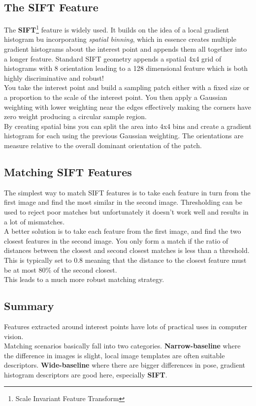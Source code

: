\documentclass{article}
\begin{document}
	\subsection{The SIFT Feature}
	The \textbf{SIFT}\footnote{Scale Invariant Feature Transform} feature is widely used. It builds on the idea of a local gradient histogram bu incorporating \textit{spatial binning}, which in essence creates multiple gradient histograms about the interest point and appends them all together into a longer feature. Standard SIFT geometry appends a spatial 4x4 grid of histograms with 8 orientation leading to a 128 dimensional feature which is both highly discriminative and robust!\\
	You take the interest point and build a sampling patch either with a fixed size or a proportion to the scale of the interest point. You then apply a Gaussian weighting with lower weighting near the edges effectively making the corners have zero weight producing a circular sample region.\\
	By creating spatial bins you can split the area into 4x4 bins and create a gradient histogram for each using the previous Gaussian weighting. The orientations are measure relative to the overall dominant orientation of the patch.
	\subsection{Matching SIFT Features}
	The simplest way to match SIFT features is to take each feature in turn from the first image and find the most similar in the second image. Thresholding can be used to reject poor matches but unfortunately it doesn't work well and results in a lot of mismatches. \\
	A better solution is to take each feature from the first image, and find the two closest features in the second image. You only form a match if the ratio of distances between the closest and second closest matches is less than a threshold. This is typically set to 0.8 meaning that the distance to the closest feature must be at most 80\% of the second closest.\\
	This leads to a much more robust matching strategy.
	\subsection{Summary}
	Features extracted around interest points have lots of practical uses in computer vision.\\
	Matching scenarios basically fall into two categories. \textbf{Narrow-baseline} where the difference in images is slight, local image templates are often suitable descriptors. \textbf{Wide-baseline} where there are bigger differences in pose, gradient histogram descriptors are good here, especially \textbf{SIFT}.
\end{document}
